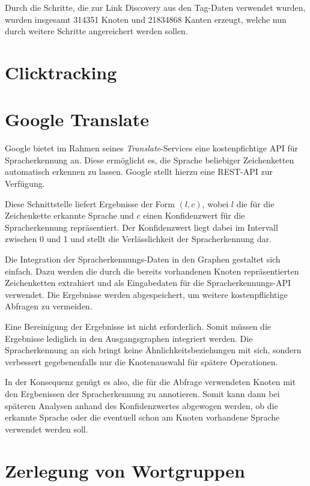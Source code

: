 Durch die Schritte, die zur Link Discovery aus den Tag-Daten verwendet wurden, wurden insgesamt \num{314351} Knoten und \num{21834868} Kanten erzeugt, welche nun durch weitere Schritte angereichert werden sollen.

\section{Clicktracking}

\section{Google Translate}

Google bietet im Rahmen seines \emph{Translate}-Services \cite{gt2013} eine kostenpfichtige API für Spracherkennung an. Diese ermöglicht es, die Sprache beliebiger Zeichenketten automatisch erkennen zu lassen. Google stellt hierzu eine REST-API zur Verfügung.

Diese Schnittstelle liefert Ergebnisse der Form \((l, c)\), wobei \(l\) die für die Zeichenkette erkannte Sprache und \(c\) einen Konfidenzwert für die Spracherkennung repräsentiert. Der Konfidenzwert liegt dabei im Intervall zwischen \num{0} und \num{1} und stellt die Verlässlichkeit der Spracherkennung dar.

Die Integration der Spracherkennungs-Daten in den Graphen gestaltet sich einfach. Dazu werden die durch die bereits vorhandenen Knoten repräsentierten Zeichenketten extrahiert und als Eingabedaten für die Spracherkennungs-API verwendet. Die Ergebnisse werden abgespeichert, um weitere kostenpflichtige Abfragen zu vermeiden.

Eine Bereinigung der Ergebnisse ist nicht erforderlich. Somit müssen die Ergebnisse lediglich in den Ausgangsgraphen integriert werden. Die Spracherkennung an sich bringt keine Ähnlichkeitsbeziehungen mit sich, sondern verbessert gegebenenfalls nur die Knotenauswahl für spätere Operationen.

In der Konsequenz genügt es also, die für die Abfrage verwendeten Knoten mit den Ergbenissen der Spracherkennung zu annotieren. Somit kann dann bei späteren Analysen anhand des Konfidenzwertes abgewogen werden, ob die erkannte Sprache oder die eventuell schon am Knoten vorhandene Sprache verwendet werden soll.

\section{Zerlegung von Wortgruppen}

